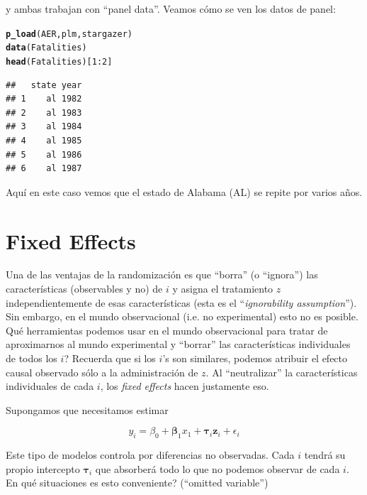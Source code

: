 \documentclass[onesided]{article}\usepackage[]{graphicx}\usepackage[]{color}
\makeatletter
\newcommand{\hlnum}[1]{\textcolor[rgb]{0.686,0.059,0.569}{#1}}%
\newcommand{\hlopt}[1]{\textcolor[rgb]{0,0,0}{#1}}%
\newcommand{\hlstd}[1]{\textcolor[rgb]{0.345,0.345,0.345}{#1}}%
\newcommand{\hlkwd}[1]{\textcolor[rgb]{0.737,0.353,0.396}{\textbf{#1}}}%
\newenvironment{kframe}{%
 \def\at@end@of@kframe{}%
 \ifinner\ifhmode%
  \def\at@end@of@kframe{\end{minipage}}%
  \begin{minipage}{\columnwidth}%
 \fi\fi%
 \def\FrameCommand##1{\hskip\@totalleftmargin \hskip-\fboxsep
 \colorbox{shadecolor}{##1}\hskip-\fboxsep
     \hskip-\linewidth \hskip-\@totalleftmargin \hskip\columnwidth}%
 \MakeFramed {\advance\hsize-\width
   \@totalleftmargin\z@ \linewidth\hsize
   \@setminipage}}%
 {\par\unskip\endMakeFramed%
 \at@end@of@kframe}
\newenvironment{knitrout}{}{} %
\makeatother
\begin{document}
y ambas trabajan con ``panel data''. Veamos c\'omo se ven los datos de panel:

\begin{knitrout}
\color{fgcolor}\begin{kframe}
\begin{alltt}
\hlkwd{p_load}\hlstd{(AER, plm, stargazer)}
\hlkwd{data}\hlstd{(Fatalities)}
\hlkwd{head}\hlstd{(Fatalities)[}\hlnum{1}\hlopt{:}\hlnum{2}\hlstd{]}
\end{alltt}
\begin{verbatim}
##   state year
## 1    al 1982
## 2    al 1983
## 3    al 1984
## 4    al 1985
## 5    al 1986
## 6    al 1987
\end{verbatim}
\end{kframe}
\end{knitrout}

Aqu\'i en este caso vemos que el estado de Alabama (AL) se repite por varios a\~nos.


\section{Fixed Effects}

Una de las ventajas de la randomizaci\'on es que ``borra'' (o ``ignora'') las caracter\'isticas (observables y no) de $i$ y asigna el tratamiento $z$ independientemente de esas caracter\'isticas (esta es el ``\emph{ignorability assumption}''). Sin embargo, en el mundo observacional (i.e. no experimental) esto no es posible. Qu\'e herramientas podemos usar en el mundo observacional para tratar de aproximarnos al mundo experimental y ``borrar'' las caracter\'isticas individuales de todos los $i$? Recuerda que si los $i$'s son similares, podemos atribuir el efecto causal observado s\'olo a la administraci\'on de $z$. Al ``neutralizar'' la caracter\'isticas individuales de cada $i$, los \emph{fixed effects} hacen justamente eso. 

Supongamos que necesitamos estimar 

\begin{equation}\label{fe}
y_{i} = \beta_{0} + {\mathbf \beta_{1}x_{1}} + {\mathbf \tau}_{i}{\mathbf z}_{i} + \epsilon_{i}
\end{equation}

Este tipo de modelos controla por diferencias no observadas. Cada $i$ tendr\'a su propio intercepto ${\mathbf \tau}_{i}$ que absorber\'a todo lo que no podemos observar de cada $i$. {\color{red}En qu\'e situaciones es esto conveniente?} (``omitted variable'')
\end{document}
